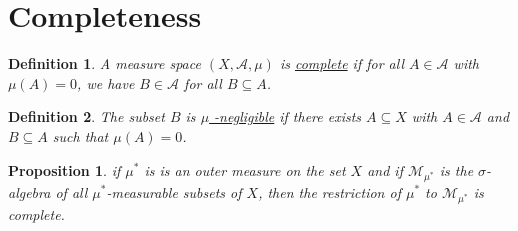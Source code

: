 \documentclass[12pt]{article}    %
\newtheorem{definition}{Definition}[subsection]
\newtheorem{proposition}{Proposition}[subsection]
\begin{document}
\section{Completeness}
\begin{definition}
	A measure space $(X, \mathcal{A}, \mu)$ is \underline{complete} if for all $A \in \mathcal{A}$ with $\mu(A) = 0$, we have $B \in \mathcal{A}$ for all $B \subseteq A$.
\end{definition}
\begin{definition}
	The subset $B$ is \underline{$\mu$ -negligible} if there exists $A\subseteq X$ with $A \in \mathcal{A}$ and $B \subseteq A$ such that $\mu(A) = 0$.
\end{definition}
\begin{proposition}
	if $\mu^*$ is is an outer measure on the set $X$ and if $\mathcal{M}_{\mu^*}$ is the $\sigma$-algebra of all $\mu^*$-measurable subsets of $X$, then the restriction of $\mu^*$ to $\mathcal{M}_{\mu^*}$ is complete.
\end{proposition}
\end{document}
